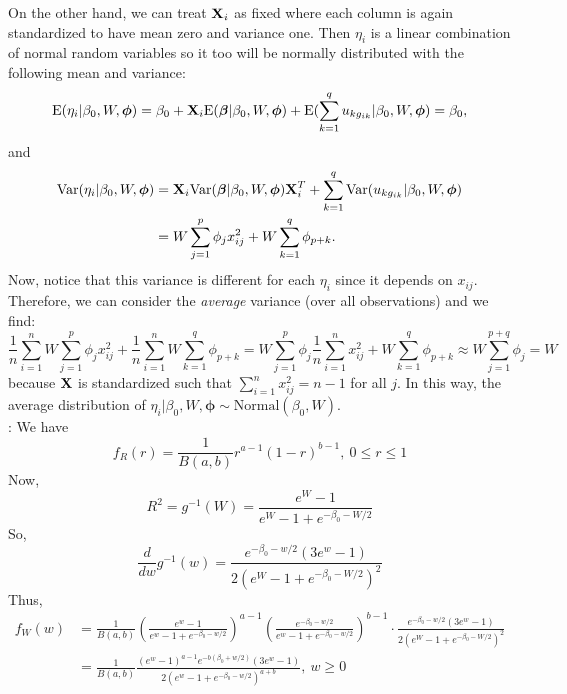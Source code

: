 \documentclass[12pt]{article}
\begin{document}
On the other hand, we can treat $\mbox{\bf X}_i$ as fixed where each column is again standardized to have mean zero and variance one. Then $\eta_i$ is a linear combination of normal random variables so it too will be normally distributed with the following mean and variance:
$$
    \mbox{E}(\eta_i|\beta_0,W,\boldsymbol\phi)
    =\beta_0 + \mbox{\bf X}_i\mbox{E}(\mbox{\boldmath $\beta$}|\beta_0,W,\boldsymbol\phi)
    + \mbox{E}(\sum_{k=1}^q u_{kg_{ik}}|\beta_0,W,\boldsymbol\phi)
    =\beta_0,
$$
and
\begin{align*}
    \mbox{Var}(\eta_i|\beta_0,W,\boldsymbol\phi)
    &=\mbox{\bf X}_i\mbox{Var}(\mbox{\boldmath $\beta$}|\beta_0,W,\boldsymbol\phi)\mbox{\bf X}_i^T + \sum_{k=1}^q \mbox{Var}(u_{kg_{ik}}|\beta_0,W,\boldsymbol\phi) \\
    &=W\sum_{j=1}^p \phi_j x_{ij}^2 + W\sum_{k=1}^q \phi_{p+k}.
\end{align*}
Now, notice that this variance is different for each $\eta_i$ since it depends on $x_{ij}$. Therefore, we can consider the {\it average} variance (over all observations) and we find:
$$
    \frac1n\sum_{i=1}^nW\sum_{j=1}^p \phi_j x_{ij}^2 + \frac1n\sum_{i=1}^nW\sum_{k=1}^q \phi_{p+k}
    =W\sum_{j=1}^p\phi_j\frac1n\sum_{i=1}^n x_{ij}^2 + W\sum_{k=1}^q \phi_{p+k}
    \approx W\sum_{j=1}^{p+q}\phi_j
    =W
$$
because $\mbox{\bf X}$ is standardized such that $\sum_{i=1}^n x_{ij}^2=n-1$ for all $j$. In this way, the average distribution of $\eta_i|\beta_0,W,\boldsymbol\phi\sim\mbox{Normal}(\beta_0,W)$.\\






: We have
$$    f_R(r)
    =\frac{1}{B(a,b)} r^{a-1}(1-r)^{b-1},\ 0\leq r\leq 1
$$
Now,
$$    R^2
    =g^{-1}(W)
    =\frac{e^W-1}{e^W-1+e^{-\beta_0-W/2}}
$$
So,
$$    \frac{d}{dw}g^{-1}(w)
    =\frac{e^{-\beta_0-w/2}(3e^w-1)}{2(e^W-1+e^{-\beta_0-W/2})^2}
$$
Thus,
\begin{align}
    f_W(w)
    &=\frac1{B(a,b)}\left(\frac{e^w-1}{e^w-1+e^{-\beta_0-w/2}}\right)^{a-1}\left(\frac{e^{-\beta_0-w/2}}{e^w-1+e^{-\beta_0-w/2}}\right)^{b-1}\cdot\frac{e^{-\beta_0-w/2}(3e^w-1)}{2(e^W-1+e^{-\beta_0-W/2})^2}\nonumber\\
    &=\frac{1}{B(a,b)} \frac{(e^w-1)^{a-1} e^{-b(\beta_0+w/2)}(3e^w-1)}{2(e^w-1+e^{-\beta_0-w/2})^{a+b}},\ w\geq0
\end{align}
\end{document}
